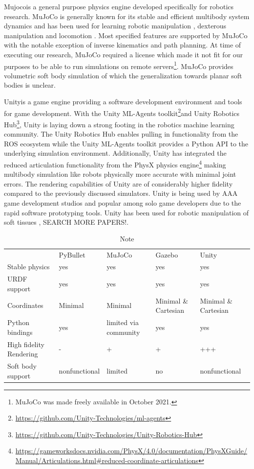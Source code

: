 \documentclass[\home/main.tex]{subfiles}
\begin{document}
Mujoco\textregistered is a general purpose physics engine developed specifically for robotics research. MuJoCo is generally known for its stable and efficient multibody system dynamics\autocite{Erez2015} and has been used for learning robotic manipulation \autocite{rajeswaran2017learning}, dexterous manipulation \autocite{openai2019solving} and locomotion \autocite{heess2017emergence}. Most specified features are supported by MuJoCo with the notable exception of inverse kinematics and path planning. At time of executing our research, MuJoCo required a license which made it not fit for our purposes to be able to run simulations on remote servers\footnote{MuJoCo was made freely available in October 2021.}. MuJoCo provides volumetric soft body simulation of which the generalization towards planar soft bodies is unclear. 

Unity\textregistered is a game engine providing a software development environment and tools for game development. With the Unity ML-Agents toolkit\footnote{\url{https://github.com/Unity-Technologies/ml-agents}}and Unity Robotics Hub\footnote{\url{https://github.com/Unity-Technologies/Unity-Robotics-Hub}}, Unity is laying down a strong footing in the robotics machine learning community. The Unity Robotics Hub enables pulling in functionality from the ROS ecosystem while the Unity ML-Agents toolkit provides a Python API to the underlying simulation environment. Additionally, Unity has integrated the reduced articulation functionality from the PhysX physics engine\footnote{\url{https://gameworksdocs.nvidia.com/PhysX/4.0/documentation/PhysXGuide/Manual/Articulations.html\#reduced-coordinate-articulations}} making multibody simulation like robots physically more accurate with minimal joint errors. The rendering capabilities of Unity are of considerably higher fidelity compared to the previously discussed simulators. Unity is being used by AAA game development studios and popular among solo game developers due to the rapid software prototyping tools. Unity has been used for robotic manipulation of soft tissues \autocite{Tagliabue2020}, SEARCH MORE PAPERS!.

\begin{table}[]
    \begin{tabular}{lllll}
                    & PyBullet & MuJoCo & Gazebo & Unity \\
    Stable physics  &     yes     &  yes      &    yes    &  yes     \\
    URDF support    &      yes    &    yes    &    yes    &   yes    \\
    Coordinates     &  Minimal &  Minimal  & Minimal \& Cartesian       & Minimal \& Cartesian    \\
    Python bindings &    yes      &   limited via community     &    yes    &   yes   \\
    High fidelity Rendering       &    -     &   +     &   +     & +++ \\     
    Soft body support       &    nonfunctional     &   limited     &   no     & nonfunctional \\     

    \end{tabular}
    \caption{Note }
\end{table}
\end{document}
